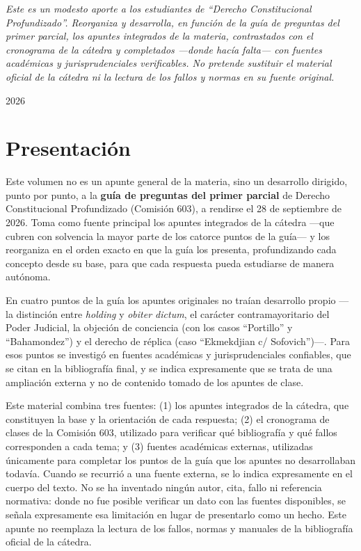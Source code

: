 \documentclass[12pt,oneside]{book}
\begin{document}
\begin{titlepage}
\vfill
\begin{flushleft}
\small\itshape
Este es un modesto aporte a los estudiantes de ``Derecho Constitucional Profundizado''.
Reorganiza y desarrolla, en función de la guía de preguntas del primer parcial, los
apuntes integrados de la materia, contrastados con el cronograma de la cátedra y
completados —donde hacía falta— con fuentes académicas y jurisprudenciales verificables.
No pretende sustituir el material oficial de la cátedra ni la lectura de los fallos y
normas en su fuente original.
\end{flushleft}
{\footnotesize 2026\par}
\end{titlepage}

\tableofcontents

\chapter*{Presentación}

Este volumen no es un apunte general de la materia, sino un desarrollo dirigido,
punto por punto, a la \textbf{guía de preguntas del primer parcial} de Derecho
Constitucional Profundizado (Comisión 603), a rendirse el 28 de septiembre de 2026.
Toma como fuente principal los apuntes integrados de la cátedra —que cubren con
solvencia la mayor parte de los catorce puntos de la guía— y los reorganiza en el
orden exacto en que la guía los presenta, profundizando cada concepto desde su base,
para que cada respuesta pueda estudiarse de manera autónoma.

En cuatro puntos de la guía los apuntes originales no traían desarrollo propio
—la distinción entre \textit{holding} y \textit{obiter dictum}, el carácter
contramayoritario del Poder Judicial, la objeción de conciencia (con los casos
``Portillo'' y ``Bahamondez'') y el derecho de réplica (caso ``Ekmekdjian
c/ Sofovich'')—. Para esos puntos se investigó en fuentes académicas y
jurisprudenciales confiables, que se citan en la bibliografía final, y se indica
expresamente que se trata de una ampliación externa y no de contenido tomado de
los apuntes de clase.

\begin{notebox}
Este material combina tres fuentes: (1) los apuntes integrados de la cátedra,
que constituyen la base y la orientación de cada respuesta; (2) el cronograma de
clases de la Comisión 603, utilizado para verificar qué bibliografía y qué fallos
corresponden a cada tema; y (3) fuentes académicas externas, utilizadas
únicamente para completar los puntos de la guía que los apuntes no desarrollaban
todavía. Cuando se recurrió a una fuente externa, se lo indica expresamente en el
cuerpo del texto. No se ha inventado ningún autor, cita, fallo ni referencia
normativa: donde no fue posible verificar un dato con las fuentes disponibles,
se señala expresamente esa limitación en lugar de presentarlo como un hecho.
Este apunte no reemplaza la lectura de los fallos, normas y manuales de la
bibliografía oficial de la cátedra.
\end{notebox}
\end{document}
